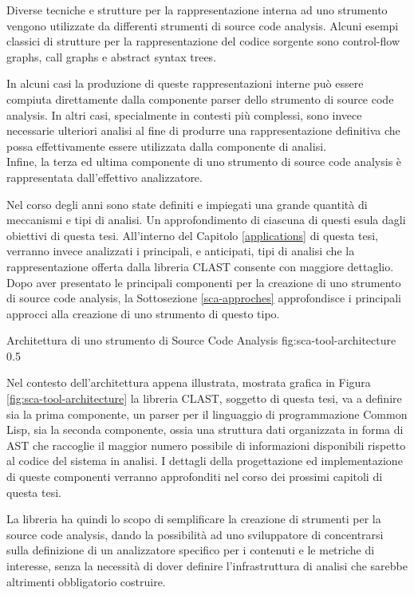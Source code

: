 Diverse tecniche e strutture per la rappresentazione interna ad uno strumento
vengono utilizzate da differenti strumenti di source code analysis. Alcuni
esempi classici di strutture per la rappresentazione del codice sorgente sono
control-flow graphs, call graphs e abstract syntax trees.

In alcuni casi la produzione di queste rappresentazioni interne può essere
compiuta direttamente dalla componente parser dello strumento di source code
analysis. In altri casi, specialmente in contesti più complessi, sono invece
necessarie ulteriori analisi al fine di produrre una rappresentazione definitiva
che possa effettivamente essere utilizzata dalla componente di analisi.\\

Infine, la terza ed ultima componente di uno strumento di source code analysis è
rappresentata dall’effettivo analizzatore.

Nel corso degli anni sono state definiti e impiegati una grande quantità di
meccanismi e tipi di analisi. Un approfondimento di ciascuna di questi esula
dagli obiettivi di questa tesi. All’interno del Capitolo \ref{applications} di
questa tesi, verranno invece analizzati i principali, e anticipati, tipi di
analisi che la rappresentazione offerta dalla libreria CLAST consente con
maggiore dettaglio.\\

Dopo aver presentato le principali componenti per la creazione di uno strumento
di source code analysis, la Sottosezione \ref{sca-approches} approfondisce i
principali approcci alla creazione di uno strumento di questo tipo.

      {Architettura di uno strumento di Source Code Analysis}
      {fig:sca-tool-architecture}
      {0.5}

Nel contesto dell'architettura appena illustrata, mostrata grafica in Figura
\ref{fig:sca-tool-architecture} la libreria CLAST, soggetto di questa tesi, va a
definire sia la prima componente, un parser per il linguaggio di programmazione
Common Lisp, sia la seconda componente, ossia una struttura dati organizzata in
forma di AST che raccoglie il maggior numero possibile di informazioni
disponibili rispetto al codice del sistema in analisi. I dettagli della
progettazione ed implementazione di queste componenti verranno approfonditi nel
corso dei prossimi capitoli di questa tesi.

La libreria ha quindi lo scopo di semplificare la creazione di strumenti per la
source code analysis, dando la possibilità ad uno sviluppatore di concentrarsi
sulla definizione di un analizzatore specifico per i contenuti e le metriche di
interesse, senza la necessità di dover definire l'infrastruttura di analisi che
sarebbe altrimenti obbligatorio costruire.

